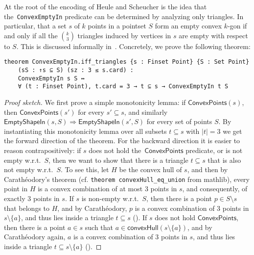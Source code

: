 At the root  of the encoding of Heule and Scheucher is the idea that the~\lstinline|ConvexEmptyIn| predicate can be determined by analyzing only triangles. In particular, that a set $s$ of $k$ points in a pointset $S$ form an empty convex $k$-gon if and only if all the ${k \choose 3}$ triangles induced by vertices in $s$ are empty with respect to $S$. This is discussed informally in~\cite[Section 3, Eq.~4]{emptyHexagonNumber}.
Concretely, we prove the following theorem:
\begin{lstlisting}
theorem ConvexEmptyIn.iff_triangles {s : Finset Point} {S : Set Point}
    (sS : ↑s ⊆ S) (sz : 3 ≤ s.card) :
    ConvexEmptyIn s S ↔
    ∀ (t : Finset Point), t.card = 3 → t ⊆ s → ConvexEmptyIn t S
\end{lstlisting}

\begin{proof}[Proof sketch]
    We first prove a simple monotonicity lemma: if $\textsf{ConvexPoints}(s)$, then $\textsf{ConvexPoints}(s')$ for every $s' \subseteq s$, and similarly $\textsf{EmptyShapeIn}(s, S) \Rightarrow \textsf{EmptyShapeIn}(s', S)$ for every set of points $S$.
    By instantiating this monotonicity lemma over all subsets $t \subseteq s$ with $|t| = 3$ we get the forward direction of the theorem.
    For the backward direction it is easier to reason contrapositively: if $s$ does not hold the~$\textsf{ConvexPoints}$ predicate, or is not empty w.r.t.~$S$, then we want to show that there is a triangle $t \subseteq s$ that is also not empty w.r.t.~$S$. To see this, let $H$ be the convex hull of $s$, and then by Carath\'eodory's theorem (cf. \lstinline|theorem convexHull_eq_union| from \textsf{mathlib}), every point in $H$ is a convex combination of at most $3$ points in $s$, and consequently, of exactly $3$ points in $s$.
    If $s$ is non-empty w.r.t.~$S$, then there is a point $p \in S \setminus s$ that belongs to $H$, and by Carath\'eodory, $p$ is a convex combination of $3$ points in $s \setminus \{a\}$, and thus lies inside a triangle $t \subseteq s$ (). If $s$ does not hold $\textsf{ConvexPoints}$, then there is a point $a \in s$ such that $a \in \textsf{convexHull}(s \setminus \{a\})$, and by Carath\'eodory again, $a$ is a convex combination of $3$ points in $s$, and thus lies inside a triangle $t \subseteq s \setminus \{a\}$ ().

\end{proof}
